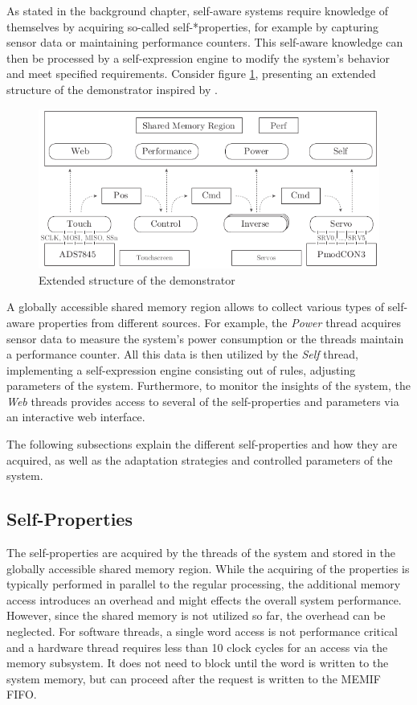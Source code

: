 As stated in the background chapter, self-aware systems require knowledge of
themselves by acquiring so-called self-*properties, for example by capturing
sensor data or maintaining performance counters. This self-aware knowledge can
then be processed by a self-expression engine to modify the system's behavior
and meet specified requirements. Consider figure \ref{fig:demo_selfaware},
presenting an extended structure of the demonstrator inspired by
\citep{AHL14}.
\begin{figure}
	\centering
	\includegraphics{../figures/demo_selfaware}
	\caption{Extended structure of the demonstrator}
	\label{fig:demo_selfaware}
\end{figure}
A globally accessible shared memory region allows to collect various types of
self-aware properties from different sources. For example, the \emph{Power}
thread acquires sensor data to measure the system's power consumption or the
threads maintain a performance counter. All this data is then utilized by the
\emph{Self} thread, implementing a self-expression engine consisting out of
rules, adjusting parameters of the system. Furthermore, to monitor the
insights of the system, the \emph{Web} threads provides access to several of
the self-properties and parameters via an interactive web interface.

The following subsections explain the different self-properties and how they
are acquired, as well as the adaptation strategies and controlled parameters
of the system.

\subsection{Self-Properties}

The self-properties are acquired by the threads of the system and stored in
the globally accessible shared memory region. While the acquiring of the
properties is typically performed in parallel to the regular processing, the
additional memory access introduces an overhead and might effects the overall
system performance. However, since the shared memory is not utilized so far,
the overhead can be neglected. For software threads, a single word access is
not performance critical and a hardware thread requires less than 10 clock
cycles for an access via the memory subsystem. It does not need to block until
the word is written to the system memory, but can proceed after the request is
written to the \ac{MEMIF} \ac{FIFO}.

